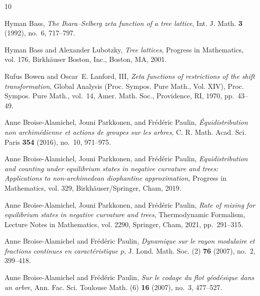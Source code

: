 \documentclass[11pt,reqno]{amsart}
\numberwithin{equation}{section}
\theoremstyle{definition}
\theoremstyle{remark}
\begin{document}
\providecommand{\bysame}{\leavevmode\hbox to3em{\hrulefill}\thinspace}
\providecommand{\MR}{\relax\ifhmode\unskip\space\fi MR }
\providecommand{\MRhref}[2]{%
  \href{http://www.ams.org/mathscinet-getitem?mr=#1}{#2}
}
\providecommand{\href}[2]{#2}
\begin{thebibliography}{10}

Hyman Bass, \emph{The {Ihara--Selberg} zeta function of a tree lattice}, Int.
  J. Math. \textbf{3} (1992), no.~6, 717--797.

Hyman Bass and Alexander Lubotzky, \emph{Tree lattices}, Progress in
  Mathematics, vol. 176, Birkh{\"a}user Boston, Inc., Boston, MA, 2001.

Rufus Bowen and Oscar~E. Lanford, III, \emph{Zeta functions of restrictions of
  the shift transformation}, Global Analysis (Proc. Sympos. Pure Math., Vol.
  XIV), Proc. Sympos. Pure Math., vol.~14, Amer. Math. Soc., Providence, RI,
  1970, pp.~43--49.

Anne Broise-Alamichel, Jouni Parkkonen, and Fr{\'e}d{\'e}ric Paulin,
  \emph{{\'E}quidistribution non archim{\'e}dienne et actions de groupes sur
  les arbres}, C. R. Math. Acad. Sci. Paris \textbf{354} (2016), no.~10,
  971--975.

Anne Broise-Alamichel, Jouni Parkkonen, and Fr{\'e}d{\'e}ric Paulin,
  \emph{Equidistribution and counting under equilibrium states in negative
  curvature and trees: Applications to non-archimedean diophantine
  approximation}, Progress in Mathematics, vol. 329, Birkh{\"a}user/Springer,
  Cham, 2019.

Anne Broise-Alamichel, Jouni Parkkonen, and Fr{\'e}d{\'e}ric Paulin, \emph{Rate
  of mixing for equilibrium states in negative curvature and trees},
  Thermodynamic Formalism, Lecture Notes in Mathematics, vol. 2290, Springer,
  Cham, 2021, pp.~291--315.

Anne Broise-Alamichel and Fr{\'e}d{\'e}ric Paulin, \emph{Dynamique sur le rayon
  modulaire et fractions continues en caract{\'e}ristique {$p$}}, J. Lond.
  Math. Soc. (2) \textbf{76} (2007), no.~2, 399--418.

Anne Broise-Alamichel and Fr{\'e}d{\'e}ric Paulin, \emph{Sur le codage du flot
  g{\'e}od{\'e}sique dans un arbre}, Ann. Fac. Sci. Toulouse Math. (6)
  \textbf{16} (2007), no.~3, 477--527.


\end{thebibliography}
\end{document}
